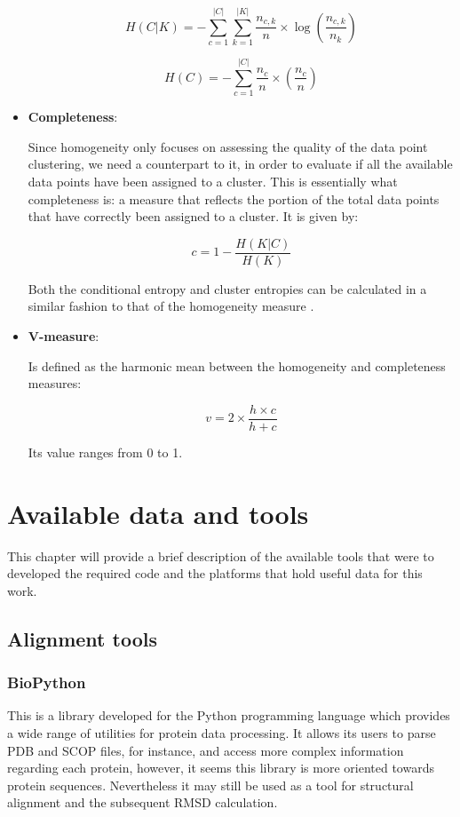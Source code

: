 \begin{itemize}
$$H(C|K) = - \sum_{c=1}^{|C|} \sum_{k=1}^{|K|} \frac{n_{c,k}}{n} \times \log \left( \frac{n_{c,k}}{n_k} \right)$$
 
$$H(C) = - \sum_{c=1}^{|C|} \frac{n_c}{n} \times \left( \frac{n_{c}}{n} \right)$$
 

\medskip 
\item \textbf{Completeness}:
 
Since homogeneity only focuses on assessing the quality of the data point clustering, we need a counterpart to it, in order to evaluate if all the available data points have been assigned to a cluster. This is essentially what completeness is: a measure that reflects the portion of the total data points that have correctly been assigned to a cluster. It is given by:

$$c = 1 - \frac{H(K|C)}{H(K)}$$

Both the conditional entropy and cluster entropies can be calculated in a similar fashion to that of the homogeneity measure \cite{rosenberg2007v} \cite{scikitlearn}.

\medskip
\item \textbf{V-measure}: 

Is defined as the harmonic mean between the homogeneity and completeness measures:

$$v = 2 \times \frac{h \times c}{h + c}$$

Its value ranges from 0 to 1. \cite{rosenberg2007v} \cite{scikitlearn} 

\end{itemize}
 
\chapter{Available data and tools} 

This chapter will provide a brief description of the available tools that were to developed the required code and the platforms that hold useful data for this work. 

\section{Alignment tools}

\subsection{BioPython}

\cite{cock2009biopython}

This is a library developed for the Python programming language which provides a wide range of utilities for protein data processing. It allows its users to parse PDB and SCOP files, for instance, and access more complex information regarding each protein, however, it seems this library is more oriented towards protein sequences. Nevertheless it may still be used as a tool for structural alignment and the subsequent RMSD calculation.


